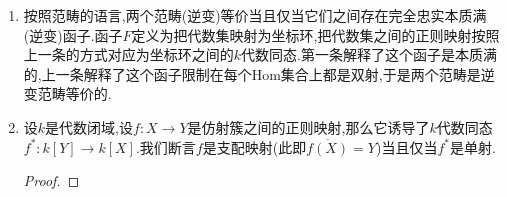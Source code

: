 \begin{enumerate}
\begin{enumerate}
\begin{proof}
    		任取正则映射$\varphi:X\to Y$,对$Y$上的任意正则函数$u$,明显的$u\circ\varphi$是$X$上的正则函数,据此我们定义了映射$\varphi^*:u\mapsto u\circ\varphi$,并它明显是一个$k$代数同态.于是我们定义了集合映射$\alpha$.
    		
    		\qquad
    		
    		下面任取$k$代数同态$h:A[Y]\to\mathscr{O}_X(X)$.设$Y\subseteq\mathbb{A}^n$,于是有$A[Y]=k[X_1,\cdots,X_n]/I(Y)$.记$X_i$在$A[Y]$中的像是$x_i$,再记$h(x_i)=\xi_i$是$X$上的整体正则函数.我们取$\psi:X\to\mathbb{A}^n$为$P\mapsto(\xi_1(P),\cdots,\xi_n(P))$.由于这个映射的分量都是正则函数,所以只要我们证明了$\psi(X)\subseteq Y$,则它是正则映射.按照$Y=Z(I(Y))$,归结为证明对任意$P\in X$和任意$f\in I(Y)$都有$f(\psi(P))=0$,但是$f(\psi(P))=h(f(x_1,\cdots,x_n))(P)=0$.于是$\alpha(\psi)=h$,这说明了$\alpha$是满射.最后说明它是单射,这是因为如果两个态射$f,g:X\to Y$诱导了相同的$k$代数同态,那么$f,g$视为分量映射时的分量正则函数是对应一致的,于是$f=g$.
    	\end{proof}
    	\item 按照范畴的语言,两个范畴(逆变)等价当且仅当它们之间存在完全忠实本质满(逆变)函子.函子$F$定义为把代数集映射为坐标环,把代数集之间的正则映射按照上一条的方式对应为坐标环之间的$k$代数同态.第一条解释了这个函子是本质满的,上一条解释了这个函子限制在每个Hom集合上都是双射,于是两个范畴是逆变范畴等价的.
    	\item 设$k$是代数闭域,设$f:X\to Y$是仿射簇之间的正则映射,那么它诱导了$k$代数同态$f^*:k[Y]\to k[X]$.我们断言$f$是支配映射(此即$\overline{f(X)}=Y$)当且仅当$f^*$是单射.
    	\begin{proof}
    		

\end{proof}
\end{enumerate}
\end{enumerate}
